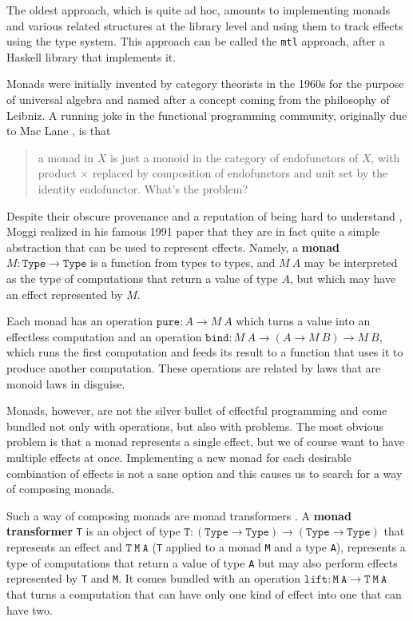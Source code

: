 \documentclass[declaration,inz,english,shortabstract]{iithesis}
\newcommand{\m}[1]{\texttt{#1}}
\newcommand{\Type}{\texttt{Type}}
\begin{document}
The oldest approach, which is quite ad hoc, amounts to implementing monads and various related structures at the library level and using them to track effects using the type system. This approach can be called the \m{mtl} approach, after a Haskell library that implements it.

Monads were initially invented by category theorists in the 1960s for the purpose of universal algebra and named after a concept coming from the philosophy of Leibniz. A running joke in the functional programming community, originally due to Mac Lane \cite{CWM}, is that

\begin{quote}
    a monad in $X$ is just a monoid in the category of endofunctors of $X$, with product $\times$ replaced by composition of endofunctors and unit set by the identity endofunctor. What's the problem?
\end{quote}

Despite their obscure provenance and a reputation of being hard to understand \cite{MonadTutorialFallacy}, Moggi realized in his famous 1991 paper \cite{Moggi} that they are in fact quite a simple abstraction that can be used to represent effects. Namely, a \textbf{monad} $M : \Type \to \Type$ is a function from types to types, and $M\ A$ may be interpreted as the type of computations that return a value of type $A$, but which may have an effect represented by $M$.

Each monad has an operation $\m{pure} : A \to M\ A$ which turns a value into an effectless computation and an operation $\m{bind} : M\ A \to (A \to M\ B) \to M\ B$, which runs the first computation and feeds its result to a function that uses it to produce another computation. These operations are related by laws that are monoid laws in disguise.

Monads, however, are not the silver bullet of effectful programming and come bundled not only with operations, but also with problems. The most obvious problem is that a monad represents a single effect, but we of course want to have multiple effects at once. Implementing a new monad for each desirable combination of effects is not a sane option and this causes us to search for a way of composing monads.

Such a way of composing monads are monad transformers \cite{mtl}. A \textbf{monad transformer} \m{T} is an object of type $\m{T} : (\Type \to \Type) \to (\Type \to \Type)$ that represents an effect and $\m{T}\ \m{M}\ \m{A}$ (\m{T} applied to a monad \m{M} and a type \m{A}), represents a type of computations that return a value of type \m{A} but may also perform effects represented by \m{T} and \m{M}. It comes bundled with an operation $\m{lift} : \m{M}\ \m{A} \to \m{T}\ \m{M}\ \m{A}$ that turns a computation that can have only one kind of effect into one that can have two.
\end{document}
